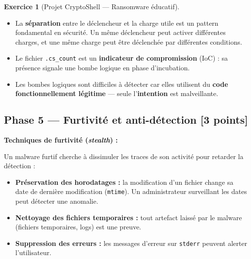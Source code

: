 \documentclass[a4paper,11pt]{article}
\theoremstyle{plain}
\theoremstyle{definition}
\newtheorem{exercice}{Exercice}
\begin{document}
\begin{exercice}[Projet CryptoShell --- Ransomware éducatif]
\begin{correction}
\begin{pointcle}
\begin{itemize}
    \item La \textbf{séparation} entre le déclencheur et la charge utile est un pattern fondamental en sécurité. Un même déclencheur peut activer différentes charges, et une même charge peut être déclenchée par différentes conditions.
    \item Le fichier \texttt{.cs\_count} est un \textbf{indicateur de compromission} (IoC) : sa présence signale une bombe logique en phase d'incubation.
    \item Les bombes logiques sont difficiles à détecter car elles utilisent du \textbf{code fonctionnellement légitime} --- seule l'\textbf{intention} est malveillante.
\end{itemize}
\end{pointcle}

\end{correction}



\subsection*{Phase 5 --- Furtivité et anti-détection \hfill \normalsize [3 points]}

\begin{rappel}
\textbf{Techniques de furtivité (\textit{stealth}) :}

Un malware furtif cherche à dissimuler les traces de son activité pour retarder la détection :
\begin{itemize}
    \item \textbf{Préservation des horodatages :} la modification d'un fichier change sa date de dernière modification (\texttt{mtime}). Un administrateur surveillant les dates peut détecter une anomalie.
    \item \textbf{Nettoyage des fichiers temporaires :} tout artefact laissé par le malware (fichiers temporaires, logs) est une preuve.
    \item \textbf{Suppression des erreurs :} les messages d'erreur sur \texttt{stderr} peuvent alerter l'utilisateur.
\end{itemize}


\end{rappel}
\end{exercice}
\end{document}
